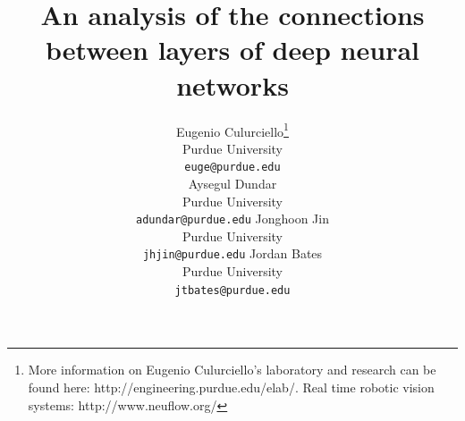 \documentclass{article} %
\begin{document}
\title{An analysis of the connections  \\ between layers of deep neural networks}

\author{
Eugenio Culurciello\thanks{More information on Eugenio Culurciello's laboratory and research can be found here: http://engineering.purdue.edu/elab/. Real time robotic vision systems: http://www.neuflow.org/} \\
Purdue University\\
\texttt{euge@purdue.edu} \\
\And
Aysegul Dundar \\
Purdue University\\
\texttt{adundar@purdue.edu}
\AND
Jonghoon Jin \\
Purdue University\\
\texttt{jhjin@purdue.edu}
\And
Jordan Bates \\
Purdue University\\
\texttt{jtbates@purdue.edu}
}


\maketitle
\end{document}
